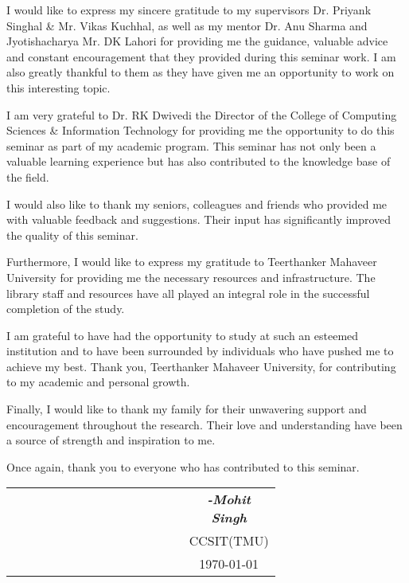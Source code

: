 I would like to express my sincere gratitude to my supervisors Dr. Priyank Singhal \& Mr. Vikas Kuchhal, as well as my mentor Dr. Anu Sharma and Jyotishacharya Mr. DK Lahori for providing me the guidance, valuable advice and constant encouragement that they provided during this seminar work. I am also greatly thankful to them as they have given me an opportunity to work on this interesting topic.

I am very grateful to Dr. RK Dwivedi the Director of the College of Computing Sciences \& Information Technology for providing me the opportunity to do this seminar as part of my academic program. This seminar has not only been a valuable learning experience but has also contributed to the knowledge base of the field.

I would also like to thank my seniors, colleagues and friends who provided me with valuable feedback and suggestions. Their input has significantly improved the quality of this seminar.

Furthermore, I would like to express my gratitude to Teerthanker Mahaveer University for providing me the necessary resources and infrastructure. The library staff and resources have all played an integral role in the successful completion of the study.

I am grateful to have had the opportunity to study at such an esteemed institution and to have been surrounded by individuals who have pushed me to achieve my best. Thank you, Teerthanker Mahaveer University, for contributing to my academic and personal growth.

Finally, I would like to thank my family for their unwavering support and encouragement throughout the research. Their love and understanding have been a source of strength and inspiration to me.

Once again, thank you to everyone who has contributed to this seminar.

\vspace{2\baselineskip}

\begin{center}
	\begin{tabular}{p{0.67\linewidth}c}
		&  \textbf{\textit{-Mohit Singh}} \\
		&  CCSIT(TMU) \\
		& \today
	\end{tabular}
\end{center}
\clearpage